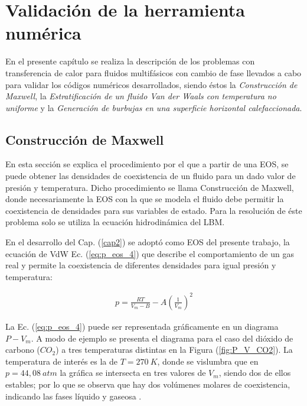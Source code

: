 \chapter{Validación de la herramienta numérica }
\graphicspath{{figs/cap4/}}
\label{cap4}

En el presente capítulo se realiza la descripción de los problemas con transferencia de calor para fluidos multifásicos con cambio de fase llevados a cabo para validar los códigos numéricos desarrollados, siendo éstos la \textit{Construcción de Maxwell}, la \textit{Estratificación de un fluido Van der Waals con temperatura no uniforme} y la \textit{Generación de burbujas en una superficie horizontal calefaccionada}.

\section{Construcción de Maxwell}

En esta sección se explica el procedimiento por el que a partir de una EOS, se puede obtener las densidades de coexistencia de un fluido para un dado valor de presión y temperatura. Dicho procedimiento se llama Construcción de Maxwell, donde necesariamente la EOS con la que se modela el fluido debe permitir la coexistencia de densidades para sus variables de estado. Para la resolución de éste problema solo se utiliza la ecuación hidrodinámica del LBM.

En el desarrollo del Cap. (\ref{cap2}) se adoptó como EOS del presente trabajo, la ecuación de VdW Ec. (\ref{eq:p_eos_4}) que describe el comportamiento de un gas real y permite la coexistencia de diferentes densidades para igual presión y temperatura:

\begin{align}
	p = \frac{R T}{V_m - B} - A {\left(\frac{1}{V_m}\right)}^2
	\label{eq:p_eos_4}
\end{align}

La Ec. (\ref{eq:p_eos_4}) puede ser representada gráficamente en un diagrama $P - V_m$. A modo de ejemplo se presenta el diagrama para el caso del dióxido de carbono ($CO_2$) a tres temperaturas distintas en la Figura (\ref{fig:P_V_CO2}).  La temperatura de interés es la de $T = 270 \> K$, donde se vislumbra que en $p = 44,08 \> atm$ la gráfica se intersecta en tres valores de $V_m$, siendo dos de ellos estables; por lo que se observa que hay dos volúmenes molares de coexistencia, indicando las fases líquido y gaseosa \cite{huang2015multiphase}. 

